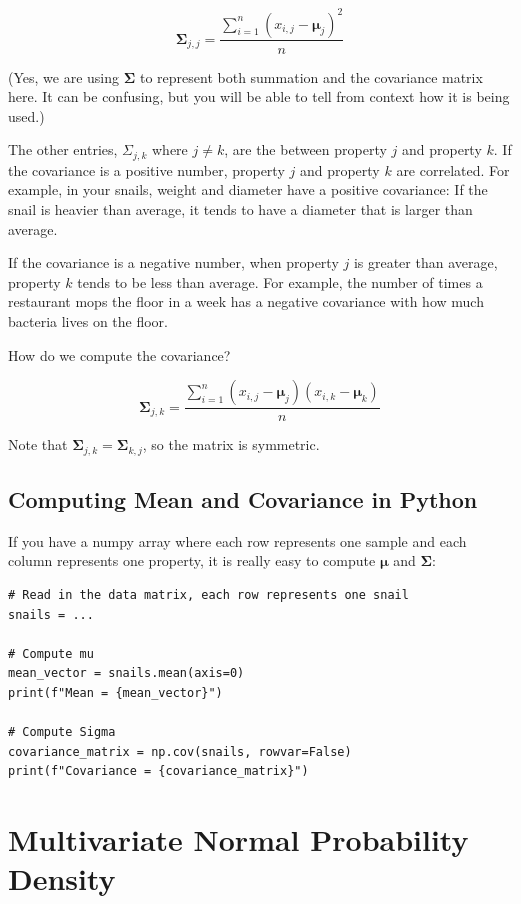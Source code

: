 $$\mathbf{\Sigma}_{j,j} = \frac{\sum_{i=1}^{n}(x_{i,j} - \boldsymbol\mu_j)^2}{n}$$

(Yes, we are using $\mathbf{\Sigma}$ to represent both summation and the covariance matrix here.
It can be confusing, but you will be able to tell from context how it is being used.)

The other entries, $\Sigma_{j,k}$ where $j \neq k$, are the  between property $j$ and property $k$.
If the covariance is a positive number, property $j$ and property $k$ are correlated. For example, in your snails, weight and diameter have a positive covariance: If the snail is heavier than average, it tends to have a diameter that is larger than average.

If the covariance is a negative number, when property $j$ is greater than average, property $k$ tends to be less than average.
For example, the number of times a restaurant mops the floor in a week has a negative covariance with how much bacteria lives on the floor.

How do we compute the covariance?

$$\mathbf{\Sigma}_{j,k} = \frac{\sum_{i=1}^{n}(x_{i,j} - \boldsymbol\mu_j)(x_{i,k} - \boldsymbol\mu_k)}{n}$$

Note that $\mathbf{\Sigma}_{j,k} = \mathbf{\Sigma}_{k,j}$, so the matrix is symmetric.

\subsection{Computing Mean and Covariance in Python}

If you have a numpy array where each row represents one sample and each column represents one property, it is really easy to compute $\boldsymbol\mu$ and $\mathbf{\Sigma}$:

\begin{verbatim}
# Read in the data matrix, each row represents one snail
snails = ...

# Compute mu
mean_vector = snails.mean(axis=0)
print(f"Mean = {mean_vector}")

# Compute Sigma
covariance_matrix = np.cov(snails, rowvar=False)
print(f"Covariance = {covariance_matrix}")
\end{verbatim}

\section{Multivariate Normal Probability Density}

